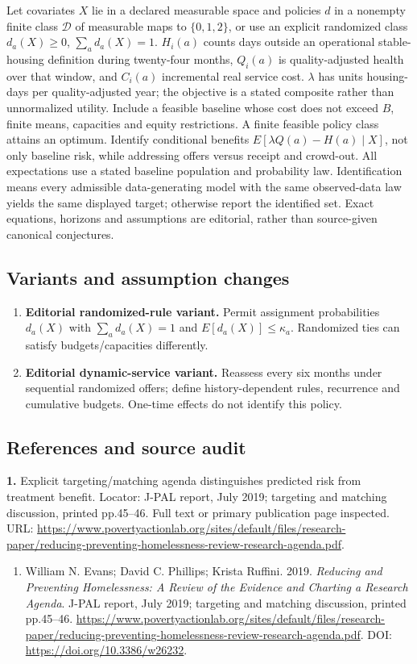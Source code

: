 \documentclass[11pt,a4paper]{article}
\begin{document}
Let covariates \(X\) lie in a declared measurable space and policies \(d\) in a nonempty finite class \(\mathcal D\) of measurable maps to \(\{0,1,2\}\), or use an explicit randomized class \(d_a(X)\geq0\), \(\sum_ad_a(X)=1\). \(H_i(a)\) counts days outside an operational stable-housing definition during twenty-four months, \(Q_i(a)\) is quality-adjusted health over that window, and \(C_i(a)\) incremental real service cost. \(\lambda\) has units housing-days per quality-adjusted year; the objective is a stated composite rather than unnormalized utility. Include a feasible baseline whose cost does not exceed \(B\), finite means, capacities and equity restrictions. A finite feasible policy class attains an optimum. Identify conditional benefits \(E[\lambda Q(a)-H(a)\mid X]\), not only baseline risk, while addressing offers versus receipt and crowd-out. All expectations use a stated baseline population and probability law. Identification means every admissible data-generating model with the same observed-data law yields the same displayed target; otherwise report the identified set. Exact equations, horizons and assumptions are editorial, rather than source-given canonical conjectures.
\subsection*{Variants and assumption changes}
\begin{enumerate}
\item \textbf{Editorial randomized-rule variant.} Permit assignment probabilities \(d_a(X)\) with \(\sum_a d_a(X)=1\) and \(E[d_a(X)]\leq\kappa_a\). Randomized ties can satisfy budgets/capacities differently.
\item \textbf{Editorial dynamic-service variant.} Reassess every six months under sequential randomized offers; define history-dependent rules, recurrence and cumulative budgets. One-time effects do not identify this policy.
\end{enumerate}
\subsection*{References and source audit}
\textbf{1.} Explicit targeting/matching agenda distinguishes predicted risk from treatment benefit. Locator: J-PAL report, July 2019; targeting and matching discussion, printed pp.45–46. Full text or primary publication page inspected. URL: \url{https://www.povertyactionlab.org/sites/default/files/research-paper/reducing-preventing-homelessness-review-research-agenda.pdf}.
\begin{enumerate}\raggedright
\item\hypertarget{definitions:source:30007751:1}{} William N. Evans; David C. Phillips; Krista Ruffini. 2019. \emph{Reducing and Preventing Homelessness: A Review of the Evidence and Charting a Research Agenda}. J-PAL report, July 2019; targeting and matching discussion, printed pp.45–46.
\url{https://www.povertyactionlab.org/sites/default/files/research-paper/reducing-preventing-homelessness-review-research-agenda.pdf}.
DOI: \url{https://doi.org/10.3386/w26232}.
\end{enumerate}
\end{document}
